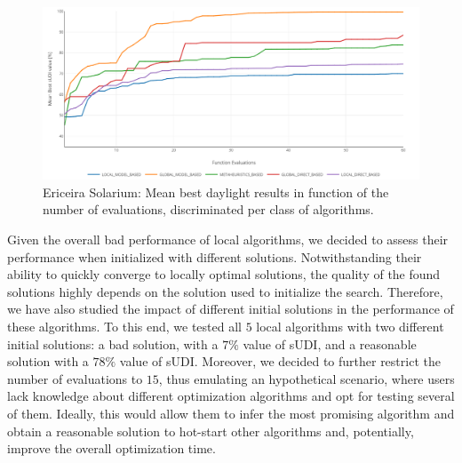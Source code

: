 \begin{figure}[htbp]
	\centering
	\includegraphics[width=1\textwidth]{Images/Evaluation/Ericeira_results_ph1_per_class.PNG}
	\caption[Ericeira Solarium: Mean best daylight results in function of the number of evaluations, discriminated per class of algorithms]{Ericeira Solarium: Mean best daylight results in function of the number of evaluations, discriminated per class of algorithms.}
	\label{fig:phase1results}
\end{figure}

Given the overall bad performance of local algorithms, we decided to assess their performance when initialized with different solutions. Notwithstanding their ability to quickly converge to locally optimal solutions, the quality of the found solutions highly depends on the solution used to initialize the search. Therefore, we have also studied the impact of different initial solutions in the performance of these algorithms. To this end, we tested all $5$ local algorithms with two different initial solutions: a bad solution, with a $7\%$ value of \ac{sUDI}, and a reasonable solution with a $78\%$ value of \ac{sUDI}. Moreover, we decided to further restrict the number of evaluations to $15$, thus emulating an hypothetical scenario, where users lack knowledge about different optimization algorithms and opt for testing several of them. Ideally, this would allow them to infer the most promising algorithm and obtain a reasonable solution to hot-start other algorithms and, potentially, improve the overall optimization time.

